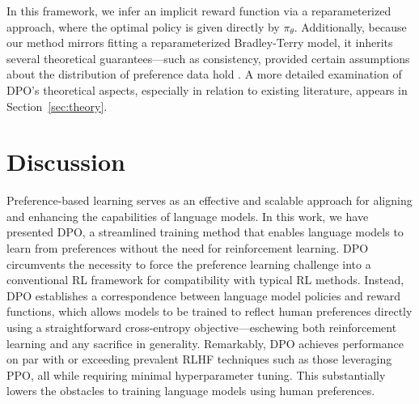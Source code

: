 In this framework, we infer an implicit reward function via a reparameterized approach, where the optimal policy is given directly by $\pi_\theta$. Additionally, because our method mirrors fitting a reparameterized Bradley-Terry model, it inherits several theoretical guarantees—such as consistency, provided certain assumptions about the distribution of preference data hold \cite{bong2022generalized}. A more detailed examination of DPO’s theoretical aspects, especially in relation to existing literature, appears in Section~\ref{sec:theory}.

\section{Discussion}
Preference-based learning serves as an effective and scalable approach for aligning and enhancing the capabilities of language models. In this work, we have presented DPO, a streamlined training method that enables language models to learn from preferences without the need for reinforcement learning. DPO circumvents the necessity to force the preference learning challenge into a conventional RL framework for compatibility with typical RL methods. Instead, DPO establishes a correspondence between language model policies and reward functions, which allows models to be trained to reflect human preferences directly using a straightforward cross-entropy objective—eschewing both reinforcement learning and any sacrifice in generality. Remarkably, DPO achieves performance on par with or exceeding prevalent RLHF techniques such as those leveraging PPO, all while requiring minimal hyperparameter tuning. This substantially lowers the obstacles to training language models using human preferences.

